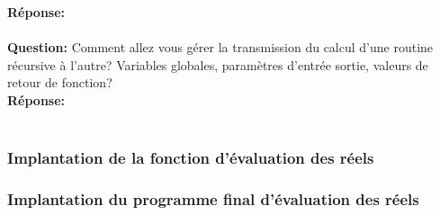 \documentclass[./standalone.tex]{subfiles}
\begin{document}
\textbf{Réponse:} \\\\

\textbf{Question:} Comment allez vous gérer la transmission du calcul d'une routine récursive à l'autre? Variables globales, paramètres d'entrée sortie, valeurs de retour de fonction?\\

\textbf{Réponse:} \\\\

\subsubsection{Implantation de la fonction d'évaluation des réels}

\subsubsection{Implantation du programme final d'évaluation des réels}
\end{document}
